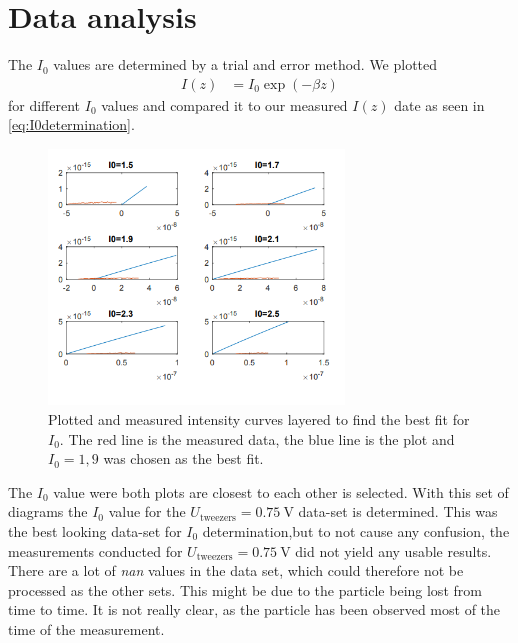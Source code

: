 \documentclass[../bericht.tex]{subfiles}
\begin{document}
    \section{Data analysis}
    \label{sec:data-analysis}

       The $I_0$ values are determined by a trial and error method.
       We plotted
       \begin{align*}
         I(z)&=I_0 \exp\left( -\beta z \right)
       \end{align*}
       for different $I_0$ values and compared it to our measured $I(z)$ date as seen in \cref{eq:I0determination}.

        \begin{figure}[tb]
              \centering
              \includegraphics[width=0.70\textwidth]{figures/I0determination.PNG}
              \caption{Plotted and measured intensity curves layered to find the best fit for $I_0$. The red line is the measured data, the blue line is the plot and $I_0= 1,9$ was chosen as the best fit. }
              \label{fig:I0determination}
        \end{figure}

        The $I_0$ value were both plots are closest to each other is selected. With this set of diagrams the $I_0$ value for the $U_\mathrm{tweezers}=\SI{0,75}{\volt}$ data-set is determined. This was the best looking data-set for $I_0$ determination,but to not cause any confusion, the measurements conducted for $U_\mathrm{tweezers}=\SI{0,75}{\volt}$ did not yield any usable results. There are a lot of \textit{nan} values in the data set, which could therefore not be processed as the other sets. This might be due to the particle being lost from time to time. It is not really clear, as the particle has been observed most of the time of the measurement.
        \medskip
\end{document}
